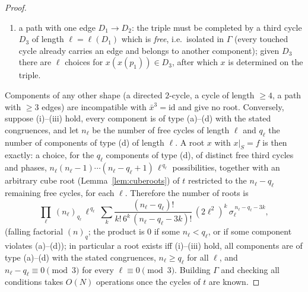 \documentclass[preprint,12pt]{elsarticle}
\theoremstyle{definition}\newtheorem{defi}[thm]{Definition}\newtheorem{prob}[thm]{Problem}\newtheorem{obs}[thm]{Observation}
\theoremstyle{remark}\newtheorem{rem}[thm]{Remark}
\begin{document}
\begin{proof}
\begin{enumerate}
\item[(d)] a path with one edge $D_1\to D_2$: the triple must be completed by a third cycle $D_3$ of length $\ell=\ell(D_1)$ which is \emph{free}, i.e.\ isolated in $\Gamma$ (every touched cycle already carries an edge and belongs to another component); given $D_3$ there are $\ell$ choices for $x(x(p_1))\in D_3$, after which $x$ is determined on the triple.
\end{enumerate}
Components of any other shape (a directed $2$-cycle, a cycle of length $\ge4$, a path with $\ge3$ edges) are incompatible with $\bar x^{3}=\mathrm{id}$ and give no root. Conversely, suppose (i)--(iii) hold, every component is of type (a)--(d) with the stated congruences, and let $n_\ell$ be the number of free cycles of length $\ell$ and $q_\ell$ the number of components of type (d) of length $\ell$. A root $x$ with $x|_S=f$ is then exactly: a choice, for the $q_\ell$ components of type (d), of distinct free third cycles and phases, $n_\ell(n_\ell-1)\cdots(n_\ell-q_\ell+1)\,\ell^{\,q_\ell}$ possibilities, together with an arbitrary cube root (Lemma~\ref{lem:cuberoots}) of $t$ restricted to the $n_\ell-q_\ell$ remaining free cycles, for each $\ell$. Therefore the number of roots is
\begin{equation}\label{eq:prescribedcount}
\prod_{\ell}\ (n_\ell)_{q_\ell}\,\ell^{\,q_\ell}\ \sum_{k}\frac{(n_\ell-q_\ell)!}{k!\,6^{k}\,(n_\ell-q_\ell-3k)!}\,(2\ell^{2})^{k}\,\sigma_\ell^{\,n_\ell-q_\ell-3k},
\end{equation}
(falling factorial $(n)_q$; the product is $0$ if some $n_\ell<q_\ell$, or if some component violates (a)--(d)); in particular a root exists iff (i)--(iii) hold, all components are of type (a)--(d) with the stated congruences, $n_\ell\ge q_\ell$ for all $\ell$, and $n_\ell-q_\ell\equiv0\pmod 3$ for every $\ell\equiv0\pmod3$. Building $\Gamma$ and checking all conditions takes $O(N)$ operations once the cycles of $t$ are known.
\end{proof}
\end{document}
